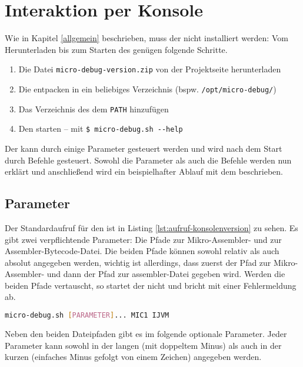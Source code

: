 \chapter{Interaktion per Konsole}
\label{bed-konsole}
Wie in Kapitel \ref{allgemein} beschrieben, muss der \md{} nicht installiert werden: Vom Herunterladen bis zum Starten des \md{} genügen folgende Schritte.

\begin{enumerate}
\item Die Datei \texttt{micro-debug-version.zip} von der Projektseite herunterladen
\item Die  entpacken in ein beliebiges Verzeichnis (bspw. \texttt{/opt/micro-debug/})
\item Das Verzeichnis des \md{} dem \texttt{PATH} hinzufügen
\item Den \md{} starten -- mit \texttt{\$ micro-debug.sh -{}-help}
\end{enumerate}

Der \md{} kann durch einige Parameter gesteuert werden und wird nach dem Start durch Befehle gesteuert. Sowohl die Parameter als auch die Befehle werden nun erklärt und anschließend wird ein beispielhafter Ablauf mit dem \md{} beschrieben.

\section{Parameter}
Der Standardaufruf für den \md{} ist in Listing \ref{lst:aufruf-konsolenversion} zu sehen. Es gibt zwei verpflichtende Parameter: Die Pfade zur Mikro-Assembler- und zur Assembler-Bytecode-Datei. Die beiden Pfade können sowohl relativ als auch absolut angegeben werden, wichtig ist allerdings, dass zuerst der Pfad zur Mikro-Assembler- und dann der Pfad zur assembler-Datei gegeben wird. Werden die beiden Pfade vertauscht, so startet der \md{} nicht und bricht mit einer Fehlermeldung ab.

\begin{lstlisting}[language=sh,caption={Aufruf des \md{} -- Konsolenversion},label=lst:aufruf-konsolenversion]
  micro-debug.sh [PARAMETER]... MIC1 IJVM
\end{lstlisting}

Neben den beiden Dateipfaden gibt es im folgende optionale Parameter. Jeder Parameter kann sowohl in der langen (mit doppeltem Minus) als auch in der kurzen (einfaches Minus gefolgt von einem Zeichen) angegeben werden.

